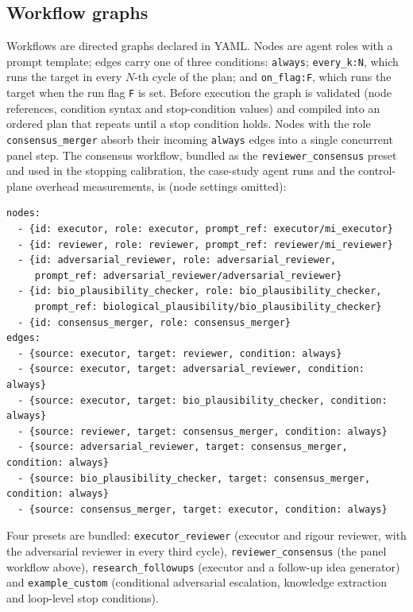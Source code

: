 \subsection*{Workflow graphs}

Workflows are directed graphs declared in YAML. Nodes are agent roles with a prompt template; edges carry one of three conditions: \texttt{always}; \texttt{every\_k:N}, which runs the target in every $N$-th cycle of the plan; and \texttt{on\_flag:F}, which runs the target when the run flag \texttt{F} is set. Before execution the graph is validated (node references, condition syntax and stop-condition values) and compiled into an ordered plan that repeats until a stop condition holds. Nodes with the role \texttt{consensus\_merger} absorb their incoming \texttt{always} edges into a single concurrent panel step. The consensus workflow, bundled as the \texttt{reviewer\_consensus} preset and used in the stopping calibration, the case-study agent runs and the control-plane overhead measurements, is (node settings omitted):

\begin{lstlisting}
nodes:
  - {id: executor, role: executor, prompt_ref: executor/mi_executor}
  - {id: reviewer, role: reviewer, prompt_ref: reviewer/mi_reviewer}
  - {id: adversarial_reviewer, role: adversarial_reviewer,
     prompt_ref: adversarial_reviewer/adversarial_reviewer}
  - {id: bio_plausibility_checker, role: bio_plausibility_checker,
     prompt_ref: biological_plausibility/bio_plausibility_checker}
  - {id: consensus_merger, role: consensus_merger}
edges:
  - {source: executor, target: reviewer, condition: always}
  - {source: executor, target: adversarial_reviewer, condition: always}
  - {source: executor, target: bio_plausibility_checker, condition: always}
  - {source: reviewer, target: consensus_merger, condition: always}
  - {source: adversarial_reviewer, target: consensus_merger, condition: always}
  - {source: bio_plausibility_checker, target: consensus_merger, condition: always}
  - {source: consensus_merger, target: executor, condition: always}
\end{lstlisting}

Four presets are bundled: \texttt{executor\_reviewer} (executor and rigour reviewer, with the adversarial reviewer in every third cycle), \texttt{reviewer\_consensus} (the panel workflow above), \texttt{research\_followups} (executor and a follow-up idea generator) and \texttt{example\_custom} (conditional adversarial escalation, knowledge extraction and loop-level stop conditions).

